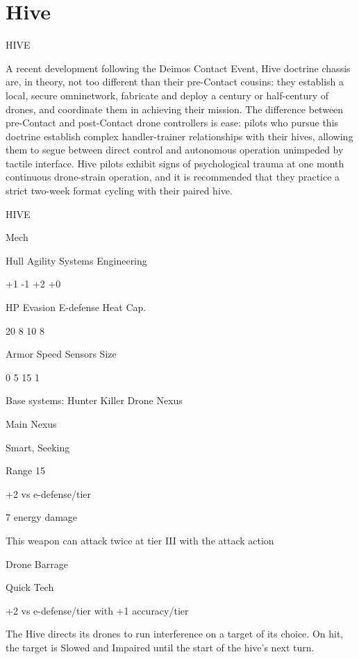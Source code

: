 \section{Hive}

                                                   HIVE  

A recent development following the Deimos Contact Event, Hive doctrine chassis are, in theory,  
not too different than their pre-Contact cousins: they establish a local, secure omninetwork,  
fabricate and deploy a century or half-century of drones, and coordinate them in achieving their  
mission. The difference between pre-Contact and post-Contact drone controllers is ease: pilots  
who pursue this doctrine establish complex handler-trainer relationships with their hives, allowing  
them to segue between direct control and autonomous operation unimpeded by tactile interface.  
Hive pilots exhibit signs of psychological trauma at one month continuous drone-strain operation,  
and it is recommended that they practice a strict two-week format cycling with their paired hive.   

 HIVE 

 Mech 

 Hull       Agility      Systems       Engineering 

 +1         -1           +2            +0 

 HP         Evasion      E-defense     Heat Cap. 

 20         8            10            8 

 Armor      Speed        Sensors       Size 

 0          5            15            1 

Base systems:  
Hunter Killer Drone Nexus
 
Main Nexus
 
Smart, Seeking
 
Range 15
 
+2 vs e-defense/tier
 
7 energy damage
 
This weapon can attack twice at tier III with the attack action
 

Drone Barrage
 
Quick Tech
 
+2 vs e-defense/tier with +1 accuracy/tier
 
The Hive directs its drones to run interference on a target of its choice. On hit, the target is  
Slowed and Impaired until the start of the hive’s next turn.
 

